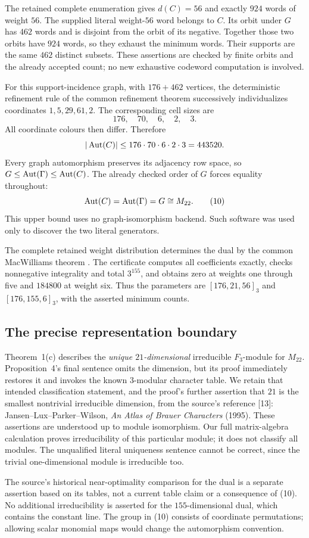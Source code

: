 The retained complete enumeration gives $d(C)=56$ and exactly $924$ words
of weight $56$. The supplied literal weight-$56$ word belongs to $C$.
Its orbit under $G$ has $462$ words and is disjoint from the orbit of its
negative. Together those two orbits have $924$ words, so they exhaust the
minimum words. Their supports are the same $462$ distinct subsets.
These assertions are checked by finite orbits and the already accepted
count; no new exhaustive codeword computation is involved.

For this support-incidence graph, with $176+462$ vertices, the deterministic
refinement rule of the common refinement theorem \cite[Theorem~6.4]{U} successively individualizes
coordinates $1,5,29,61,2$. The corresponding cell sizes are
\[
 176,\quad70,\quad6,\quad2,\quad3.
\]
All coordinate colours then differ. Therefore
\[
 |\operatorname{Aut}(C)|\leq176\cdot70\cdot6\cdot2\cdot3=443520.
\]
Every graph automorphism preserves its adjacency row space, so
$G\leq\operatorname{Aut}(\Gamma)\leq\operatorname{Aut}(C)$. The already checked order of $G$ forces
equality throughout:
\[
 \operatorname{Aut}(C)=\operatorname{Aut}(\Gamma)=G\cong M_{22}.                 \tag{10}
\]
This upper bound uses no graph-isomorphism backend. Such software was
used only to discover the two literal generators.

The complete retained weight distribution determines the dual by the common MacWilliams theorem \cite[Theorem~7.1]{U}.
The certificate computes all coefficients exactly, checks nonnegative
integrality and total $3^{155}$, and obtains zero at weights one through
five and $184800$ at weight six. Thus the parameters are
$[176,21,56]_3$ and $[176,155,6]_3$, with the asserted minimum counts.

\subsection{The precise representation boundary}
Theorem~1(c) describes the \emph{unique $21$-dimensional} irreducible
$F_3$-module for $M_{22}$. Proposition~4's final sentence omits the dimension,
but its proof immediately restores it and invokes the known $3$-modular
character table. We retain that intended classification statement, and
the proof's further assertion that $21$ is the smallest nontrivial
irreducible dimension, from the source's reference [13]:
Jansen--Lux--Parker--Wilson, \emph{An Atlas of Brauer Characters} (1995).
These assertions are understood up to module isomorphism. Our full
matrix-algebra calculation proves irreducibility of this particular
module; it does not classify all modules. The unqualified literal
uniqueness sentence cannot be correct, since the trivial one-dimensional
module is irreducible too.

The source's historical near-optimality comparison for the dual is a
separate assertion based on its tables, not a current table claim or a
consequence of (10). No additional irreducibility is asserted for the
$155$-dimensional dual, which contains the constant line. The group in
(10) consists of coordinate permutations; allowing scalar monomial maps
would change the automorphism convention.

